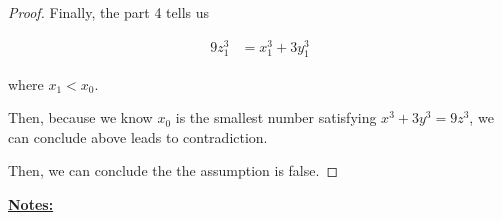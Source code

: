 \documentclass[12pt]{article}
\begin{document}
\begin{itemize}
\begin{proof}
        \bigskip

        Finally, the part 4 tells us

        \begin{align}
            9z_1^3 &= x_1^3 + 3y_1^3
        \end{align}

        where $x_1 < x_0$.

        \bigskip

        Then, because we know $x_0$ is the smallest
        number satisfying $x^3 + 3y^3 = 9z^3$, we can conclude above leads to
        contradiction.

        \bigskip

        Then, we can conclude the the assumption is false.

    \end{proof}
\end{itemize}

\bigskip

\underline{\textbf{Notes:}}
\end{document}
